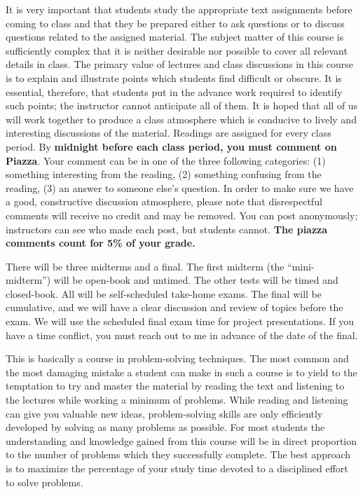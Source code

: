 \documentclass[12pt]{article}
\begin{document}
{\begin{description}
        It is very important that students study the appropriate text
        assignments before coming to class and that they be prepared either to
        ask questions or to discuss questions related to the assigned
        material.  The subject matter of this course is sufficiently complex
        that it is neither desirable nor possible to cover all relevant
        details in class.  The primary value of lectures and class discussions
        in this course is to explain and illustrate points which students find
        difficult or obscure.  It is essential, therefore, that students put
        in the advance work required to identify such points; the instructor
        cannot anticipate all of them.  It is hoped that all of us will work
        together to produce a class atmosphere which is conducive to lively
        and interesting discussions of the material.
        Readings are
        assigned for every class period. By \textbf{midnight before each
        class period, you must comment on Piazza}. Your comment can be
        in one of the three following categories: (1) something
        interesting from the reading, (2) something confusing from the
        reading, (3) an answer to someone else’s question. In order to
        make sure we have a good, constructive discussion atmosphere,
        please note that disrespectful comments will receive no credit
        and may be removed. You can post anonymously; instructors can
        see who made each post, but students cannot.
        \textbf{The piazza comments count for 5\% of your grade.}
        
  \item[Exams:] There will be three midterms and a final. The first
        midterm (the ``mini-midterm'') will be open-book and
        untimed. The other tests will be timed and closed-book. All
        will be self-scheduled take-home exams. The final will be
        cumulative, and we will have a clear discussion and review of topics before
        the exam. We will use the scheduled final exam time for
        project presentations.
        If you have a time conflict, you must reach out to me in
        advance of the date of the final.

  \item[Homework:] This is basically a course in
        problem-solving techniques.  The most common and the most damaging
        mistake a student can make in such a course is to yield to the
        temptation to try and master the material by reading the text and
        listening to the lectures while working a minimum of problems.  While
        reading and listening can give you valuable new ideas, problem-solving
        skills are only efficiently developed by solving as many problems as
        possible.  For most students the understanding and knowledge gained
        from this course will be in direct proportion to the number of
        problems which they successfully complete.  The best approach is to
        maximize the percentage of your study time devoted to a disciplined
        effort to solve problems.
        

\end{description}}
\end{document}
